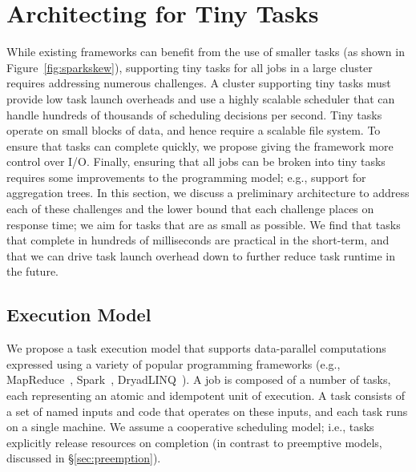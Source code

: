 \section{Architecting for Tiny Tasks}
\label{sec:architecture}

While existing frameworks can benefit from the use of smaller tasks (as shown
in Figure~\ref{fig:sparkskew}), supporting tiny tasks for all jobs in a large cluster
requires addressing numerous challenges.
A cluster supporting tiny tasks must provide low task launch overheads and use
a highly scalable scheduler that can
handle hundreds of thousands of scheduling decisions per second. %
Tiny tasks operate on
small blocks of data, and hence require a scalable file system. To ensure that
tasks can complete quickly, we propose giving the framework more control
over I/O. %
Finally, ensuring
that all jobs can be broken into tiny tasks requires some improvements
to the programming model; e.g., support for aggregation trees.
In this section, we discuss a preliminary architecture to address
each of these challenges and the lower bound that each challenge places
on response time; we aim for tasks that are as small as possible.
We find that tasks that complete in hundreds of milliseconds
are practical in the short-term, and that we can drive task launch overhead
down to further reduce task runtime in the future.

\subsection{Execution Model}
We propose a task execution model that supports data-parallel computations
expressed using a variety of popular programming frameworks (e.g.,
MapReduce~\cite{dean2004mapreduce}, Spark~\cite{zaharia2010spark},
DryadLINQ~\cite{yu2008dryadlinq}).
A job is composed of a number of tasks, each representing an atomic
and idempotent unit of execution. A task consists of a set of named inputs
and code that operates on these inputs, and each task runs on a single machine.
We assume a cooperative scheduling model; i.e., tasks explicitly release
resources on completion (in contrast to preemptive models, discussed in
\S\ref{sec:preemption}).


